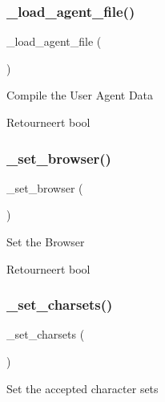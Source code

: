 \subsubsection{\texorpdfstring{\_load\_agent\_file()}{\_load\_agent\_file()}}
{\footnotesize\ttfamily \+\_\+load\+\_\+agent\+\_\+file (\begin{DoxyParamCaption}{ }\end{DoxyParamCaption})\hspace{0.3cm}{\ttfamily [protected]}}

Compile the User Agent Data

\begin{DoxyReturn}{Retourneert}
bool 
\end{DoxyReturn}
\mbox{\label{class_c_i___user__agent_a6788d0353e44d81a1214fe367ebce0f5}} 
\subsubsection{\texorpdfstring{\_set\_browser()}{\_set\_browser()}}
{\footnotesize\ttfamily \+\_\+set\+\_\+browser (\begin{DoxyParamCaption}{ }\end{DoxyParamCaption})\hspace{0.3cm}{\ttfamily [protected]}}

Set the Browser

\begin{DoxyReturn}{Retourneert}
bool 
\end{DoxyReturn}
\mbox{\label{class_c_i___user__agent_ae97780ac0ec104137f47641061288f3c}} 
\subsubsection{\texorpdfstring{\_set\_charsets()}{\_set\_charsets()}}
{\footnotesize\ttfamily \+\_\+set\+\_\+charsets (\begin{DoxyParamCaption}{ }\end{DoxyParamCaption})\hspace{0.3cm}{\ttfamily [protected]}}

Set the accepted character sets

